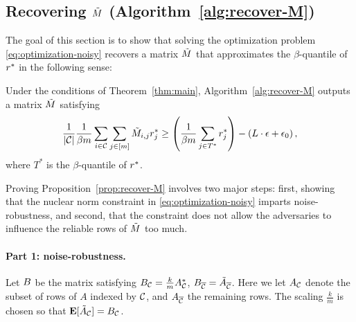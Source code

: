 \subsection{Recovering $\tilde{M}$ (Algorithm~\ref{alg:recover-M})}
\label{sec:approach-M}

The goal of this section is to show that solving the optimization 
problem \eqref{eq:optimization-noisy} recovers a matrix $\tilde{M}$ that 
approximates the $\beta$-quantile of $r^*$ in the following sense:
\begin{proposition}
\label{prop:recover-M}
Under the conditions of Theorem~\ref{thm:main}, Algorithm~\ref{alg:recover-M} 
outputs a matrix $\tilde{M}$ satisfying 
\[ \frac{1}{|\mathcal{C}|} \frac{1}{\beta m} \sum_{i \in \mathcal{C}} \sum_{j \in [m]} \tilde{M}_{i,j}r^*_j \geq \left( \frac{1}{\beta m} \sum_{j \in T^*} r^*_j \right) - \left( L \cdot \epsilon + \epsilon_0 \right), \]
where $T^*$ is the $\beta$-quantile of $r^*$.
\end{proposition}
Proving Proposition~\ref{prop:recover-M} involves two major steps: first, 
showing that the nuclear norm constraint in \eqref{eq:optimization-noisy} 
imparts noise-robustness, and second, that the constraint does not allow 
the adversaries to influence the reliable rows of $\tilde{M}$ too much.

\paragraph{Part 1: noise-robustness.} Let $B$ be the matrix satisfying 
$B_{\mathcal{C}} = \frac{k}{m}A^*_{\mathcal{C}}$, $B_{\overline{\mathcal{C}}} = \tilde{A}_{\overline{\mathcal{C}}}$. Here we 
let $A_{\mathcal{C}}$ denote the subset of rows of $A$ indexed by $\mathcal{C}$, and 
$A_{\overline{\mathcal{C}}}$ the remaining rows. The scaling $\frac{k}{m}$ is chosen so that 
$\mathbf{E}[\tilde{A}_{\mathcal{C}}] = B_{\mathcal{C}}$.

